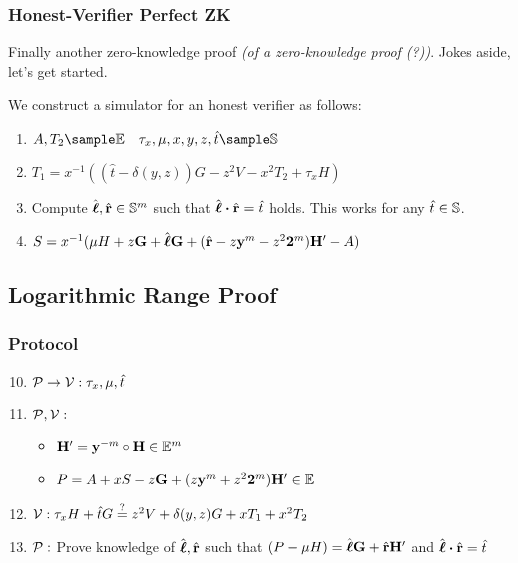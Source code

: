 \subsubsection{Honest-Verifier Perfect ZK}

Finally another zero-knowledge proof \emph{(of a zero-knowledge proof (?))}.
Jokes aside, let's get started.

We construct a simulator for an honest verifier as follows:
%
\begin{enumerate}
    \item $A, T_2 \sample \curve \quad \tau_x, \mu, x, y, z, \hat{t} \sample \scalars$
    \item $T_1 = x^{-1} ((\hat{t} - \delta(y, z))G - z^2V - x^2T_2 + \tau_xH)$
    \item Compute $\hat{\mathbf{\boldsymbol{\ell}}}, \hat{\mathbf{r}} \in \mathbb{S}^m$ such that $\hat{\mathbf{\boldsymbol{\ell}}} \boldsymbol{\cdot} \hat{\mathbf{r}} = \hat{t}$ holds.
        This works for any $\hat{t} \in \mathbb{S}$.
    \item $S = x^{-1} (\mu H + z\mathbf{G} + \hat{\mathbf{\boldsymbol{\ell}}}\mathbf{G} + (\hat{\mathbf{r}} - z\mathbf{y}^m - z^2\mathbf{2}^m)\mathbf{H}' - A)$
\end{enumerate}



\subsection{Logarithmic Range Proof}

\subsubsection{Protocol}

\begin{enumerate}
    \setcounter{enumi}{9}
    \item $\mathcal{P} \to \mathcal{V}: \tau_x, \mu, \hat{t}$
    \item \hfill $\mathcal{P}, \mathcal{V}:$
        \begin{itemize}
            \item \hfill $\mathbf{H}' = \mathbf{y}^{-m} \circ \mathbf{H} \in \mathbb{E}^m$
            \item \hfill $P = A + xS - z\mathbf{G} + (z \mathbf{y}^m + z^2 \mathbf{2}^m) \mathbf{H}' \in \mathbb{E}$
        \end{itemize}
    \item \hfill $\mathcal{V}: \tau_x H + \hat{t} G \overset{?}{=} z^2 V + \delta(y, z) G + x T_1 + x^2 T_2$
    \item $\mathcal{P}:$ Prove knowledge of $\hat{\mathbf{\boldsymbol{\ell}}}, \hat{\mathbf{r}}$ such that $(P - \mu H) = \hat{\mathbf{\boldsymbol{\ell}}} \mathbf{G} + \hat{\mathbf{r}} \mathbf{H}'$ and $\hat{\mathbf{\boldsymbol{\ell}}} \boldsymbol{\cdot} \hat{\mathbf{r}} = \hat{t}$
\end{enumerate}

